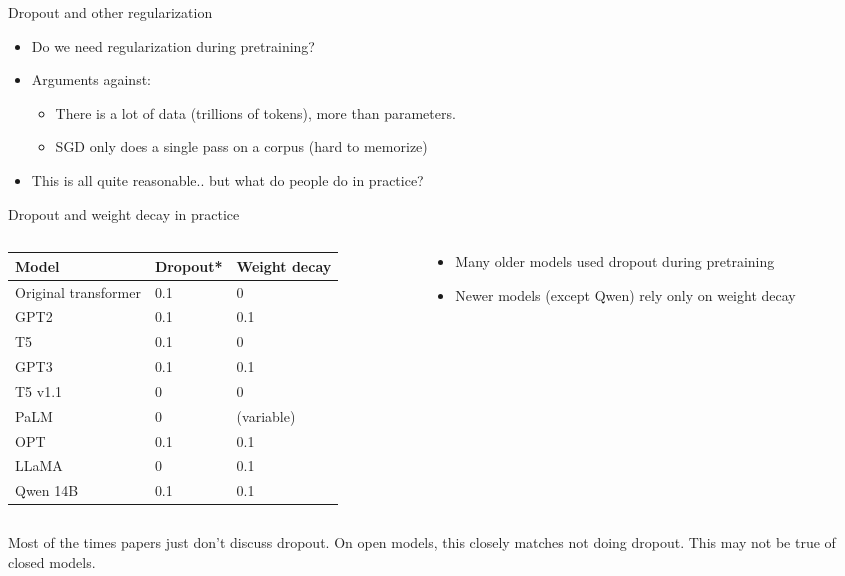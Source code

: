\begin{frame}{Dropout and other regularization}
\begin{itemize}
  \item Do we need regularization during pretraining?
  \item Arguments against:
  \begin{itemize}
    \item There is a lot of data (trillions of tokens), more than parameters.
    \item SGD only does a single pass on a corpus (hard to memorize)
  \end{itemize}
  \item This is all quite reasonable.. but what do people do in practice?
\end{itemize}
\end{frame}

\begin{frame}{Dropout and weight decay in practice}
\begin{columns}[T]
\begin{column}{0.58\textwidth}
\footnotesize
\renewcommand{\arraystretch}{0.95}
\begin{tabular}{@{}lll@{}}
\toprule
\textbf{Model} & \textbf{Dropout*} & \textbf{Weight decay}\\
\midrule
Original transformer & 0.1 & 0\\
GPT2 & 0.1 & 0.1\\
T5 & 0.1 & 0\\
GPT3 & 0.1 & 0.1\\
T5 v1.1 & 0 & 0\\
PaLM & 0 & (variable)\\
OPT & 0.1 & 0.1\\
LLaMA & 0 & 0.1\\
Qwen 14B & 0.1 & 0.1\\
\bottomrule
\end{tabular}
\end{column}
\begin{column}{0.4\textwidth}
\vspace{2.5em}
\begin{itemize}
  \item Many older models used dropout during pretraining
  \item Newer models (except Qwen) rely only on weight decay
\end{itemize}
\end{column}
\end{columns}
\vfill
{\scriptsize * Most of the times papers just don't discuss dropout. On open models, this closely matches not doing dropout. This may not be true of closed models.\par}
\end{frame}


